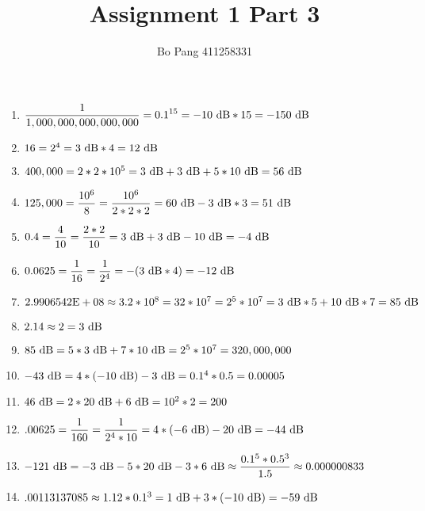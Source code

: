 \documentclass{article}
\title{\vspace{-1in}Assignment 1 Part 3}
\author{Bo Pang 411258331}
\date{}
\begin{document}
\maketitle
\begin{enumerate}
    \item 
    $\displaystyle{\frac{1}{1,000,000,000,000,000}} = 0.1^{15} = -10 \  \rm{dB} * 15 = -150 \  \rm{dB}$

    \item 
    $16 = 2 ^ 4 = 3 \  \rm{dB} * 4 = 12 \  \rm{dB}$

    \item
    $400,000 = 2 * 2 * 10 ^ 5 = 3 \  \rm{dB} + 3 \  \rm{dB} + 5 * 10 \  \rm{dB} = 56 \  \rm{dB}$

    \item
    $125,000 = \displaystyle{\frac{10 ^ 6}{8}} = \displaystyle{\frac{10 ^ 6}{2 * 2 * 2}} = 60 \  \rm{dB} - 3 \  \rm{dB} * 3 = 51 \  \rm{dB}$

    \item
    $0.4 = \displaystyle{\frac{4}{10}} = \displaystyle{\frac{2 * 2}{10}} = 3 \  \rm{dB} + 3 \  \rm{dB} - 10 \  \rm{dB} = -4 \  \rm{dB}$

    \item
    $0.0625 = \displaystyle{\frac{1}{16}} = \displaystyle{\frac{1}{2 ^ 4}} = -(3 \  \rm{dB} * 4) = -12 \  \rm{dB}$

    \item
    $2.9906542\rm{E}+08 \approx 3.2 * 10 ^ 8 = 32 * 10 ^ 7 = 2 ^ 5 * 10 ^ 7 = 3 \  \rm{dB} * 5 + 10 \  \rm{dB} * 7 = 85 \  \rm{dB}$

    \item
    $2.14 \approx 2 = 3 \  \rm{dB}$

    \item
    $85 \  \rm{dB} = 5 * 3 \  \rm{dB} + 7 * 10 \  \rm{dB} = 2 ^ 5 * 10 ^ 7 = 320,000,000$

    \item
    $-43 \  \rm{dB} = 4 * (-10 \  \rm{dB}) - 3 \  \rm{dB} = 0.1 ^ 4 * 0.5 = 0.00005$

    \item
    $46 \  \rm{dB} = 2 * 20 \  \rm{dB} + 6 \  \rm{dB} = 10 ^ 2 * 2 = 200$

    \item
    $.00625 = \displaystyle{\frac{1}{160}} = \displaystyle{\frac{1}{2 ^ 4 * 10}} = 4 * (-6 \  \rm{dB}) - 20 \  \rm{dB} = -44 \  \rm{dB}$

    \item
    $-121 \  \rm{dB} = -3 \  \rm{dB} - 5 * 20 \  \rm{dB} - 3 * 6 \  \rm{dB} \approx \displaystyle{\frac{0.1 ^ 5 * 0.5 ^ 3}{1.5}} \approx 0.000000833$

    \item
    $.00113137085 \approx 1.12 * 0.1 ^ 3 = 1 \  \rm{dB} + 3 * (-10 \  \rm{dB}) = -59 \  \rm{dB}$
  \end{enumerate}
\end{document}
